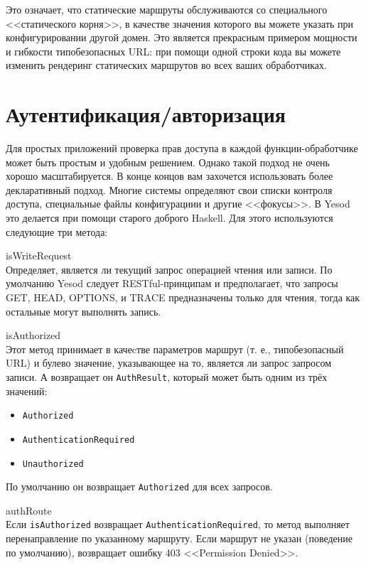 Это означает, что статические маршруты обслуживаются со специального <<статического корня>>, в качестве значения которого вы можете указать при конфигурировании другой домен. Это является прекрасным примером мощности и гибкости типобезопасных URL: при помощи одной строки кода вы можете изменить рендеринг статических маршрутов во всех ваших обработчиках.

\section {Аутентификация/авторизация}

Для простых приложений проверка прав доступа в каждой функции-обработчике может быть простым и удобным решением. Однако такой подход не очень хорошо масштабируется. В конце концов вам захочется использовать более декларативный подход. Многие системы определяют свои списки контроля доступа, специальные файлы конфигурациии и другие <<фокусы>>. В Yesod это делается при помощи старого доброго Haskell. Для этого используются следующие три метода:

\begin{description}
  \item {isWriteRequest} \hfill \\
    Определяет, является ли текущий запрос операцией чтения или записи. По умолчанию Yesod следует RESTful-принципам и предполагает, что запросы GET, HEAD, OPTIONS, и TRACE предназначены только для чтения, тогда как остальные могут выполнять запись.

  \item {isAuthorized} \hfill \\

    Этот метод принимает в качеcтве параметров маршрут (т. е., типобезопасный URL) и булево значение, указывающее на то, является ли запрос запросом записи. А возвращает он \lstinline!AuthResult!, который может быть одним из трёх значений:

    \begin{itemize}
      \item \lstinline!Authorized!
      \item \lstinline!AuthenticationRequired!
      \item \lstinline!Unauthorized!
    \end{itemize}

    По умолчанию он возвращает \lstinline!Authorized! для всех запросов.

  \item {authRoute} \hfill \\

    Если \lstinline!isAuthorized! возвращает \lstinline!AuthenticationRequired!, то метод выполняет перенаправление по указанному маршруту. Если маршрут не указан (поведение по умолчанию), возвращает ошибку 403 <<Permission Denied>>.

\end{description}

